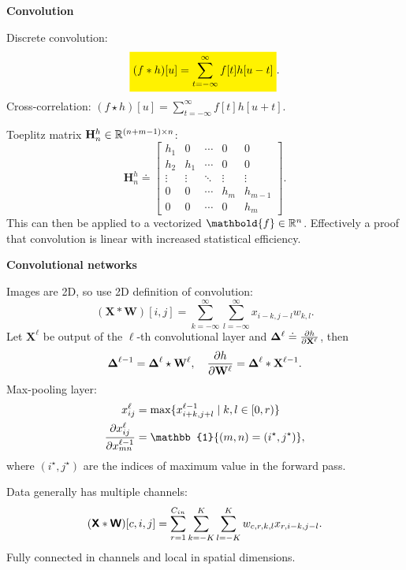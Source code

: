 \documentclass[10pt]{article}
\newenvironment{topic}[1]
{\textbf{\sffamily \footnotesize \colorbox{black}{\rlap{\textbf{\textcolor{white}{#1}}}\hspace{\linewidth}\hspace{-2\fboxsep}}}}
{}
\newenvironment{subtopic}[1]
{\begin{center}\textbf{\footnotesize \sffamily #1}\end{center}}
{}
\renewcommand{\mat}[1]{\ensuremath{\mathbf{#1}}}
\renewcommand{\vec}[1]{\ensuremath{\mathbold{#1}}}
\begin{document}
\begin{multicols*}{3}
\begin{topic}{Convolutional networks}
\begin{subtopic}{Convolution}
            Discrete convolution: \[
                \colorbox{yellow}{$\displaystyle (f * h)[u] = \sum_{t=-\infty}^{\infty} f[t]h[u-t]$}.
            \]
            Cross-correlation: $(f \star h)[u] = \sum_{t=-\infty}^{\infty} f[t] h[u+t]$.

            Toeplitz matrix $\mat{H}_n^h \in \R^{(n+m-1)\times n}$: \[
                \mat{H}_n^h \doteq
                \begin{bmatrix}
                    h_1    & 0      & \cdots & 0      & 0       \\
                    h_2    & h_1    & \cdots & 0      & 0       \\
                    \vdots & \vdots & \ddots & \vdots & \vdots  \\
                    0      & 0      & \cdots & h_m    & h_{m-1} \\
                    0      & 0      & \cdots & 0      & h_m
                \end{bmatrix}.
            \]
            This can then be applied to a vectorized $\vec{f} \in \R^n$. Effectively a proof that convolution
            is linear with increased statistical efficiency.
        \end{subtopic}

        \begin{subtopic}{Convolutional networks}
            Images are 2D, so use 2D definition of convolution: \[
                (\mat{X} * \mat{W})[i,j] = \sum_{k=-\infty}^{\infty} \sum_{l=-\infty}^{\infty} x_{i-k,j-l} w_{k,l}.
            \]
            Let $\mat{X}^{\ell}$ be output of the $\ell$-th convolutional layer and $\mat{\Delta}^{\ell} \doteq
                \pdv{h}{\mat{X}^{\ell}}$, then \[
                \mat{\Delta}^{\ell-1} = \mat{\Delta}^{\ell} \star \mat{W}^{\ell}, \quad \pdv{h}{\mat{W}^{\ell}} = \mat{\Delta}^{\ell} * \mat{X}^{\ell-1}.
            \]
            Max-pooling layer:
            \begin{align*}
                x^{\ell}_{ij}                        & = \max \{ x^{\ell-1}_{i+k,j+l} \mid k, l \in [0,r) \} \\
                \pdv{x_{ij}^{\ell}}{x^{\ell-1}_{mn}} & = \mathbb{1}\{ (m,n) = (i^\star,j^\star) \},
            \end{align*}
            where $(i^\star, j^\star)$ are the indices of maximum value in the forward pass.

            Data generally has multiple channels: \[
                (\bm{\mathsf{X}} * \bm{\mathsf{W}})[c,i,j] = \sum_{r=1}^{C_{in}} \sum_{k=-K}^{K} \sum_{l=-K}^{K} w_{c,r,k,l} x_{r,i-k,j-l}.
            \]
            Fully connected in channels and local in spatial dimensions.


\end{subtopic}
\end{topic}
\end{multicols*}
\end{document}
